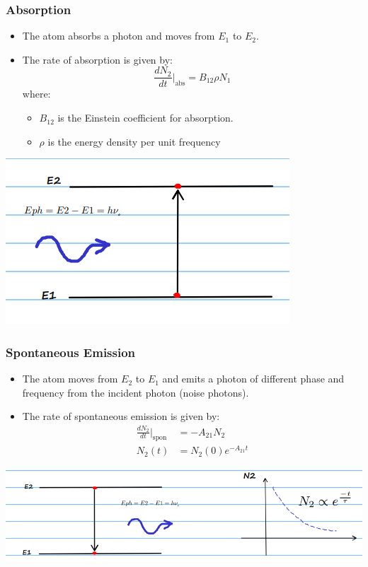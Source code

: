 \documentclass[11pt]{article}
\begin{document}
\subsubsection{Absorption}
\begin{itemize}
    \item The atom absorbs a photon and moves from $E_1$ to $E_2$.
    \item The rate of absorption is given by:
    \begin{equation*}
        \frac{dN_2}{dt} \bigg|_{\text{abs}} = B_{12} \rho N_1   
    \end{equation*}
    where:
    \begin{itemize}
        \item $B_{12}$ is the Einstein coefficient for absorption.
        \item $\rho$ is the energy density per unit frequency
    \end{itemize}
\end{itemize}
\begin{center}
    \includegraphics[scale=0.8]{2.png}
\end{center}

\subsubsection{Spontaneous Emission}
\begin{itemize}
    \item The atom moves from $E_2$ to $E_1$ and emits a photon of different phase and frequency from the incident photon (noise photons).
    \item The rate of spontaneous emission is given by:
    \begin{align*}
        \frac{dN_2}{dt} \bigg|_{\text{spon}} &= -A_{21} N_2 \\
        N_2(t) &= N_2(0) e^{-A_{21}t}
    \end{align*}
\end{itemize}
\begin{center}
    \includegraphics[scale=0.8]{3.png}
\end{center}
\end{document}

